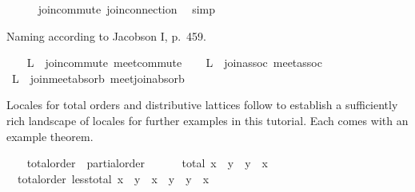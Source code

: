 \begin{isabellebody}
\ \ \ \ \isamarkupfalse%
\ join{}commute\ join{}connection\ \isamarkupfalse%
\ simp%
\begin{isamarkuptext}%
Naming according to Jacobson I, p.\ 459.%
\end{isamarkuptext}%
\isamarkuptrue%
\ \ \isamarkupfalse%
\ L{}\ {}\ join{}commute\ meet{}commute\isanewline
\ \ \isamarkupfalse%
\ L{}\ {}\ join{}assoc\ meet{}assoc\isanewline
\ \ \isanewline
\ \ \isamarkupfalse%
\ L{}\ {}\ join{}meet{}absorb\ meet{}join{}absorb%
\endisataginvisible
{\isafoldinvisible}%
%
\isadeliminvisible
\isanewline
%
\endisadeliminvisible
\isanewline
\ \ \isamarkupfalse%
%
\begin{isamarkuptext}%
Locales for total orders and distributive lattices follow to
  establish a sufficiently rich landscape of locales for
  further examples in this tutorial.  Each comes with an example
  theorem.%
\end{isamarkuptext}%
\isamarkuptrue%
\ \ \isamarkupfalse%
\ total{}order\ {}\ partial{}order\ {}\isanewline
\ \ \ \ \ total{}\ {}x\ {}\ y\ {}\ y\ {}\ x{}\isanewline
\isanewline
\ \ \isamarkupfalse%
\ {}\ total{}order{}\ less{}total{}\ {}x\ {}\ y\ {}\ x\ {}\ y\ {}\ y\ {}\ x{}\isanewline

\end{isabellebody}
